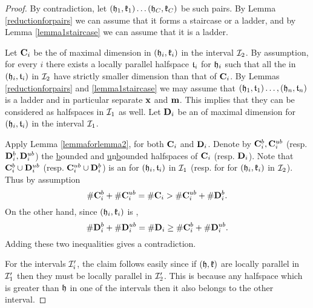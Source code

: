 \begin{proof}
	By contradiction, let $(\mathfrak{h}_1, \mathfrak{k}_1)\dots (\mathfrak{h}_C, \mathfrak{k}_C)$ be such pairs. By Lemma \ref{reductionforpairs} we can assume that it forms a staircase or a ladder, and by 
	Lemma \ref{lemma1staircase} we can assume that it is a ladder. %
	
	Let $\mathbf{C}_i$ be the \intc of maximal dimension in $(\mathfrak{h}_i,\mathfrak{k}_i)$ in the interval $\mathcal{I}_2$. 
	By assumption, for every $i$ there exists a locally parallel halfspace $\mathfrak{t}_i$ for $\mathfrak{h}_i$ such that all the \intcs in $(\mathfrak{h}_i,\mathfrak{t}_i)$ in $\mathcal{I}_2$ have strictly smaller dimension than that of $\mathbf{C}_i$.
	By Lemmas \ref{reductionforpairs} and \ref{lemma1staircase} we may assume that $(\mathfrak{h}_1,\mathfrak{t}_1)\ldots,(\mathfrak{h}_n,\mathfrak{t}_n)$ is a ladder
	and in particular separate $\mathbf{x}$ and $\mathbf{m}$. 
	This implies that they can be considered as halfspaces in $\mathcal{I}_1$ as well.
	Let $\mathbf{D}_i$ be an \intc of maximal dimension for $(\mathfrak{h}_i,\mathfrak{t}_i)$ in the interval $\mathcal{I}_1$.
	
	Apply Lemma \ref{lemmaforlemma2}, for both $\mathbf{C}_i$ and $\mathbf{D}_i$. Denote by $\mathbf{C}^b_i,\mathbf{C}^{ub}_i$ (resp. $\mathbf{D}^b_i,\mathbf{D}^{ub}_i$) the \underline{b}ounded and \underline{u}n\underline{b}ounded halfspaces of $\mathbf{C}_i$ (resp. $\mathbf{D}_i$). Note that $\mathbf{C}^b_i\cup \mathbf{D}^{ub}_i$ (resp. $\mathbf{C}^{ub}_i\cup\mathbf{D}^{b}_i$) is an \intc for $(\mathfrak{h}_i,\mathfrak{t}_i)$ in $\mathcal{I}_1$ (resp. \intc for for $(\mathfrak{h}_i,\mathfrak{k}_i)$ in $\mathcal{I}_2$).
	Thus by assumption \[\#\mathbf{C}^b_i+\#\mathbf{C}^{ub}_i = \#\mathbf{C}_i > \#\mathbf{C}^{ub}_i + \#\mathbf{D}^{b}_i.\] On the other hand, since $(\mathfrak{h}_i,\mathfrak{k}_i)$ is \adjP, \[\#\mathbf{D}^b_i+\#\mathbf{D}^{ub}_i=\#\mathbf{D}_i \ge \#\mathbf{C}^b_i + \#\mathbf{D}^{ub}_i.\] Adding these two inequalities gives a contradiction.
	
	For the intervals $\mathcal{I}'_i$, the claim follows easily since if $(\mathfrak{h},\mathfrak{k})$ are locally parallel in $\mathcal{I}'_1$ then they must be locally parallel in $\mathcal{I}'_2$. This is because any halfspace which is greater than $\mathfrak{h}$ in one of the intervals then it also belongs to the other interval.
\end{proof}